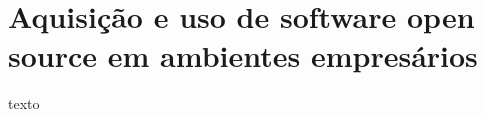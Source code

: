 \section{Aquisição e uso de software open source em ambientes empresários} \label{section: aquisição}
texto